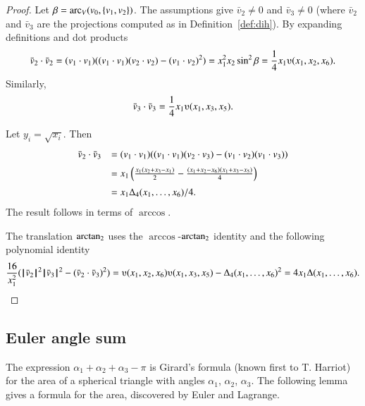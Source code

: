 \begin{proof}
Let $\beta = \operatorname{arc}_V(v_0,\{v_1,v_2\})$.
The assumptions give $\bar v_2\ne 0$ and $\bar v_3 \ne 0$ (where $\bar v_2$ and
$\bar v_3$ are the projections computed as in Definition~\ref{def:dih}).  
    By expanding definitions and dot products
    $$
    \bar v_2\cdot \bar v_2 = (v_1\cdot v_1) ((v_1\cdot v_1)(v_2\cdot v_2) -
    (v_1\cdot v_2)^2) =  x_1^2 x_2 \sin^2 \beta = \frac{1}{4}
    x_1
    \ups(x_1,x_2,x_6).
    $$
    Similarly,
    $$\bar v_3 \cdot \bar v_3 = \frac{1}{4} x_1 \ups(x_1,x_3,x_5).$$

Let $y_i = \sqrt{x_i}$. Then
    $$\begin{array}{lll}
    \bar v_2\cdot \bar v_3 &= (v_1\cdot v_1)((v_1\cdot v_1)(v_2\cdot v_3) -
    (v_1\cdot v_2)(v_1\cdot v_3) ) \vspace{6pt} \\  &
    = x_1 \left(\frac{ x_1 (x_2 + x_3 -
    x_1)}{2} - \frac{(x_1 + x_2 - x_6)(x_1 + x_3 -
    x_5)}{4} \right)\vspace{6pt}\\&
    = {x_1\Delta_4(x_1,\ldots,x_6)}/{4}.
    \end{array}
    $$
The result follows in terms of $\arccos$.

The translation ${\operatorname{arctan_2}}$ uses the $\arccos$-${\operatorname{arctan_2}}$ identity
and the following polynomial identity
    $$
    \frac{16}{x_1^2}(\normo{\bar v_2}^2 \normo{\bar v_3}^2 - (\bar v_2\cdot \bar v_3)^2) =
    \ups(x_1,x_2,x_6)\ups(x_1,x_3,x_5) - \Delta_4(x_1,\ldots,x_6)^2
    = 4 x_1 \Delta(x_1,\ldots,x_6).
    $$
\end{proof}






\subsection{Euler angle sum}

The expression $\alpha_1+\alpha_2+\alpha_3-\pi$ is Girard's
formula (known first to T. Harriot) 
for the area of a spherical triangle with angles
$\alpha_1$, $\alpha_2$, $\alpha_3$.  The following lemma
gives a formula for the area, discovered by
Euler and Lagrange.

